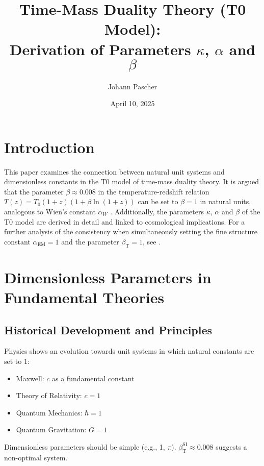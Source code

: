 \documentclass[12pt,a4paper]{article}
\newcommand{\alphaEM}{\alpha_{\text{EM}}}
\newcommand{\betaT}{\beta_{\text{T}}}
\begin{document}
	
	\title{Time-Mass Duality Theory (T0 Model): \\ Derivation of Parameters \(\kappa\), \(\alpha\) and \(\beta\)}
	\author{Johann Pascher}
	\date{April 10, 2025}
	
	\maketitle
	
	\section*{Introduction}
	
	This paper examines the connection between natural unit systems and dimensionless constants in the T0 model of time-mass duality theory. It is argued that the parameter \(\beta \approx 0.008\) in the temperature-redshift relation \(T(z) = T_0 (1+z)(1+\beta\ln(1+z))\) can be set to \(\beta = 1\) in natural units, analogous to Wien's constant \(\alpha_W\) \cite{pascher_temp_2025}. Additionally, the parameters \(\kappa\), \(\alpha\) and \(\beta\) of the T0 model are derived in detail and linked to cosmological implications. For a further analysis of the consistency when simultaneously setting the fine structure constant \(\alphaEM = 1\) and the parameter \(\betaT = 1\), see \cite{pascher_alphabeta_2025}.
	
	\tableofcontents
	\newpage
	
	\section{Dimensionless Parameters in Fundamental Theories}
	
	\subsection{Historical Development and Principles}
	
	Physics shows an evolution towards unit systems in which natural constants are set to 1:
	\begin{itemize}
		\item Maxwell: \(c\) as a fundamental constant
		\item Theory of Relativity: \(c = 1\)
		\item Quantum Mechanics: \(\hbar = 1\)
		\item Quantum Gravitation: \(G = 1\)
	\end{itemize}
	Dimensionless parameters should be simple (e.g., 1, \(\pi\)). \(\betaT^{\text{SI}} \approx 0.008\) suggests a non-optimal system.
	
\end{document}
